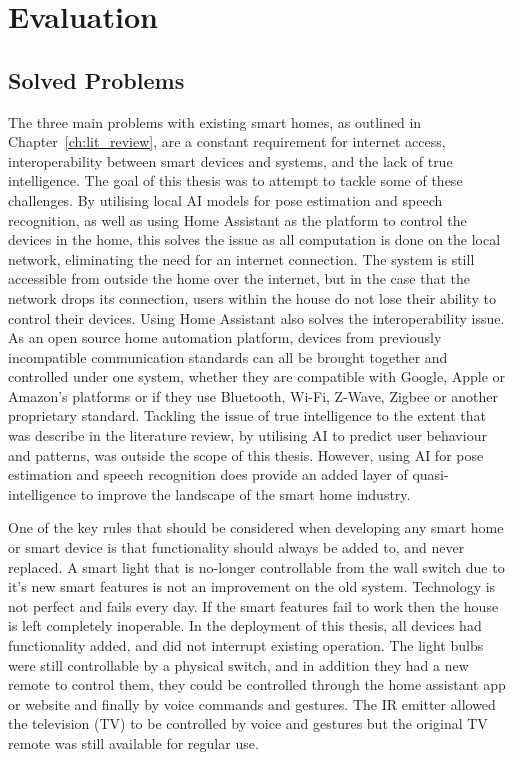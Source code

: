 \chapter{Evaluation}\label{ch:evaluation}

\section{Solved Problems}
The three main problems with existing smart homes, as outlined in Chapter~\ref{ch:lit_review}, are a constant requirement for internet access, interoperability between smart devices and systems, and the lack of true intelligence.
The goal of this thesis was to attempt to tackle some of these challenges.
By utilising local AI models for pose estimation and speech recognition, as well as using Home Assistant as the platform to control the devices in the home, this solves the issue as all computation is done on the local network, eliminating the need for an internet connection.
The system is still accessible from outside the home over the internet, but in the case that the network drops its connection, users within the house do not lose their ability to control their devices.
Using Home Assistant also solves the interoperability issue.
As an open source home automation platform, devices from previously incompatible communication standards can all be brought together and controlled under one system, whether they are compatible with Google, Apple or Amazon's platforms or if they use Bluetooth, Wi-Fi, Z-Wave, Zigbee or another proprietary standard.
Tackling the issue of true intelligence to the extent that was describe in the literature review, by utilising AI to predict user behaviour and patterns, was outside the scope of this thesis.
However, using AI for pose estimation and speech recognition does provide an added layer of quasi-intelligence to improve the landscape of the smart home industry.

One of the key rules that should be considered when developing any smart home or smart device is that functionality should always be added to, and never replaced.
A smart light that is no-longer controllable from the wall switch due to it's new smart features is not an improvement on the old system.
Technology is not perfect and fails every day.
If the smart features fail to work then the house is left completely inoperable.
In the deployment of this thesis, all devices had functionality added, and did not interrupt existing operation.
The light bulbs were still controllable by a physical switch, and in addition they had a new remote to control them, they could be controlled through the home assistant app or website and finally by voice commands and gestures.
The IR emitter allowed the television (TV) to be controlled by voice and gestures but the original TV remote was still available for regular use.

